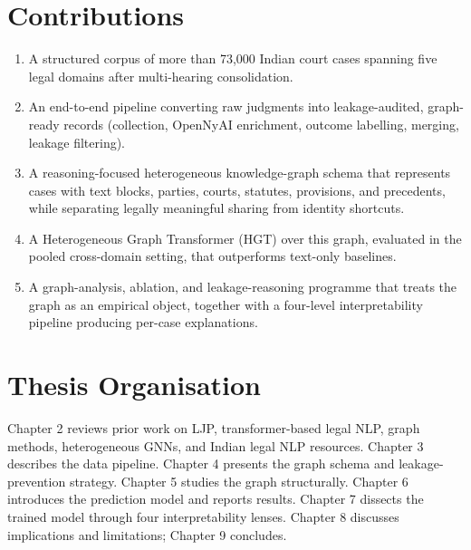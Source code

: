 \section{Contributions}

\begin{enumerate}
    \item A structured corpus of more than 73{,}000 Indian court cases spanning five legal domains after multi-hearing consolidation.
    \item An end-to-end pipeline converting raw judgments into leakage-audited, graph-ready records (collection, OpenNyAI enrichment, outcome labelling, merging, leakage filtering).
    \item A reasoning-focused heterogeneous knowledge-graph schema that represents cases with text blocks, parties, courts, statutes, provisions, and precedents, while separating legally meaningful sharing from identity shortcuts.
    \item A Heterogeneous Graph Transformer (HGT) over this graph, evaluated in the pooled cross-domain setting, that outperforms text-only baselines.
    \item A graph-analysis, ablation, and leakage-reasoning programme that treats the graph as an empirical object, together with a four-level interpretability pipeline producing per-case explanations.
\end{enumerate}

\section{Thesis Organisation}

Chapter 2 reviews prior work on LJP, transformer-based legal NLP, graph methods, heterogeneous GNNs, and Indian legal NLP resources. Chapter 3 describes the data pipeline. Chapter 4 presents the graph schema and leakage-prevention strategy. Chapter 5 studies the graph structurally. Chapter 6 introduces the prediction model and reports results. Chapter 7 dissects the trained model through four interpretability lenses. Chapter 8 discusses implications and limitations; Chapter 9 concludes.
